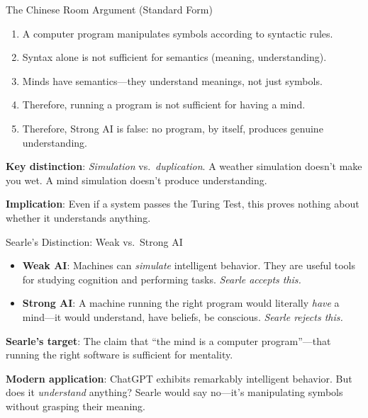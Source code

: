 \documentclass[aspectratio=169,11pt]{beamer}
\begin{document}
\begin{frame}{The Chinese Room Argument (Standard Form)}
\begin{objectionbox}
\small
\begin{enumerate}
    \item A computer program manipulates symbols according to syntactic rules.
    \item Syntax alone is not sufficient for semantics (meaning, understanding).
    \item Minds have semantics---they understand meanings, not just symbols.
    \item Therefore, running a program is not sufficient for having a mind.
    \item Therefore, Strong AI is false: no program, by itself, produces genuine understanding.
\end{enumerate}
\end{objectionbox}

\vspace{0.2em}
\textbf{Key distinction}: \emph{Simulation} vs.\ \emph{duplication}. A weather simulation doesn't make you wet. A mind simulation doesn't produce understanding.

\vspace{0.2em}
\textbf{Implication}: Even if a system passes the Turing Test, this proves nothing about whether it understands anything.
\end{frame}

\begin{frame}{Searle's Distinction: Weak vs.\ Strong AI}
\begin{conceptbox}
\small
\begin{itemize}
    \item \textbf{Weak AI}: Machines can \emph{simulate} intelligent behavior. They are useful tools for studying cognition and performing tasks. \emph{Searle accepts this.}
    \item \textbf{Strong AI}: A machine running the right program would literally \emph{have} a mind---it would understand, have beliefs, be conscious. \emph{Searle rejects this.}
\end{itemize}
\end{conceptbox}

\vspace{0.3em}
\textbf{Searle's target}: The claim that ``the mind is a computer program''---that running the right software is sufficient for mentality.

\vspace{0.3em}
\textbf{Modern application}: ChatGPT exhibits remarkably intelligent behavior. But does it \emph{understand} anything? Searle would say no---it's manipulating symbols without grasping their meaning.
\end{frame}
\end{document}
